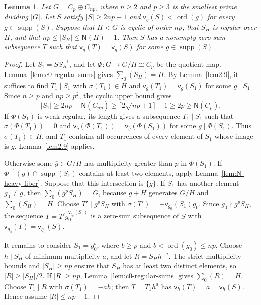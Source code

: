 \documentclass[10pt,reqno]{amsart}
\newtheorem{lem}[thm]{Lemma}
\theoremstyle{definition}
\theoremstyle{remark}
\numberwithin{equation}{section}
\DeclareMathOperator{\ord}{ord}
\DeclareMathOperator{\supp}{supp}
\begin{document}
\begin{lem}\label{lem:N-index-p-complete}
Let $G=C_p\oplus C_{np}$, where $n\ge2$ and $p\ge3$ is the
smallest prime dividing $|G|$.
Let $S$ satisfy $|S|\ge2np-1$ and
$\mathsf v_g(S)<\ord(g)$ for every $g\in\supp(S)$.
Suppose that $H<G$ is cyclic of order $np$, that $S_H$ is regular
over $H$, and that $np\le|S_H|\le\mathsf N(H)-1$.
Then $S$ has a nonempty zero-sum subsequence $T$ such that
$\mathsf v_g(T)=\mathsf v_g(S)$ for some $g\in\supp(S)$.
\end{lem}

\begin{proof}
Let $S_1=SS_H^{-1}$, and let $\Phi:G\to G/H\cong C_p$ be the quotient map.
Lemma~\ref{lem:c0-regular-sums} gives $\sum_0(S_H)=H$.
By Lemma~\ref{lem2.9}, it suffices to find $T_1\mid S_1$
with $\sigma(T_1)\in H$ and $\mathsf v_g(T_1)=\mathsf v_g(S_1)$
for some $g\mid S_1$.
Since $n\ge p$ and $np\ge p^2$, the cyclic upper bound gives
\[
 |S_1|\ge2np-\mathsf N(C_{np})
 \ge\lceil2\sqrt{np+1}\rceil-1\ge2p\ge\mathsf N(C_p).
\]
If $\Phi(S_1)$ is weak-regular, its length gives a subsequence
$T_1\mid S_1$ such that $\sigma(\Phi(T_1))=0$ and
$\mathsf v_{\bar g}(\Phi(T_1))=\mathsf v_{\bar g}(\Phi(S_1))$
for some $\bar g\mid\Phi(S_1)$.
Thus $\sigma(T_1)\in H$, and $T_1$ contains all occurrences of every
element of $S_1$ whose image is $\bar g$. Lemma~\ref{lem2.9} applies.

Otherwise some $\bar g\in G/H$ has multiplicity greater than $p$
in $\Phi(S_1)$. If $\Phi^{-1}(\bar g)\cap\supp(S_1)$ contains at least
two elements, apply Lemma~\ref{lem:N-heavy-fiber}.
Suppose that this intersection is $\{g\}$.
If $S_1$ has another element $g_0\ne g$, then
$\sum_0(g^pS_H)=G$, because $g+H$ generates $G/H$ and
$\sum_0(S_H)=H$.
Choose $T'\mid g^pS_H$ with $\sigma(T')=-\mathsf v_{g_0}(S_1)g_0$.
Since $g_0\nmid g^pS_H$, the sequence
$T=T'g_0^{\mathsf v_{g_0}(S_1)}$ is a zero-sum subsequence of $S$
with $\mathsf v_{g_0}(T)=\mathsf v_{g_0}(S)$.

It remains to consider $S_1=g_0^b$, where $b\ge p$ and
$b<\ord(g_0)\le np$.
Choose $h\mid S_H$ of minimum multiplicity $a$, and let $R=S_Hh^{-a}$.
The strict multiplicity bounds and $|S_H|\ge np$ ensure that
$S_H$ has at least two distinct elements, so $|R|\ge|S_H|/2$.
If $|R|\ge np$, Lemma~\ref{lem:c0-regular-sums} gives $\sum_0(R)=H$.
Choose $T_1\mid R$ with $\sigma(T_1)=-ah$; then $T=T_1h^a$
has $\mathsf v_h(T)=a=\mathsf v_h(S)$.
Hence assume $|R|\le np-1$.


\end{proof}
\end{document}
